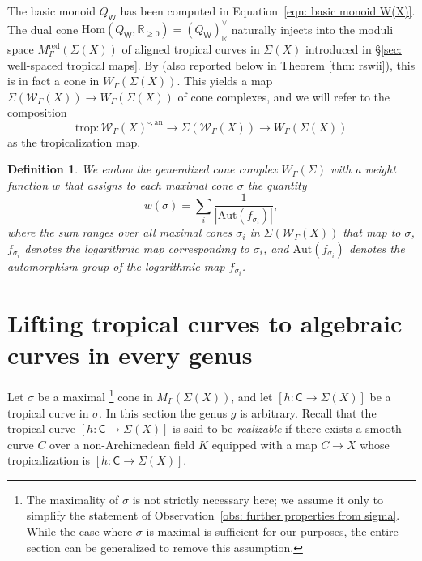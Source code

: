 \documentclass{article}
\def\N{{\mathbb{N}}}
\def\cW{\mathcal{W}}
\newtheorem{definition}{Definition}[section]
\newcommand{\W}{\mathsf{W}}
\begin{document}
The basic monoid $Q_{\W}$ has been computed in Equation~\eqref{eqn: basic monoid W(X)}. 
The dual cone
$
\mathrm{Hom}(Q_{\W}, \mathbb{R}_{\ge 0}) = (Q_{\W})^\vee_{\mathbb{R}}
$
naturally injects into the moduli space $M_{\Gamma}^{\mathrm{red}}(\Sigma(X))$ of aligned tropical curves in $\Sigma(X)$ introduced in \S\ref{sec: well-spaced tropical maps}. 
By \cite[Theorem~4.4.8]{RSWII} (also reported below in Theorem \ref{thm: rswii}), this is in fact a cone in $W_\Gamma(\Sigma(X))$. 
This yields a map
$
\Sigma(\mathcal{W}_{\Gamma}(X)) \to W_\Gamma(\Sigma(X))
$
of cone complexes, and we will refer to the composition
\[
\mathrm{trop} \colon \mathcal{W}_\Gamma(X)^{\circ, \mathrm{an}} 
\to \Sigma(\mathcal{W}_{\Gamma}(X)) 
\to W_\Gamma(\Sigma(X))
\]
as the tropicalization map.

\begin{definition}\label{def: weights}
    We endow the generalized cone complex $W_{\Gamma}(\Sigma)$ with a weight function $w$ that assigns to each maximal cone $\sigma$ the quantity
\[
w(\sigma)= \sum_i \frac{1}{|\mathrm{Aut}(f_{\sigma_i})|},
\]
where the sum ranges over all maximal cones $\sigma_i$ in $\Sigma(\cW_{\Gamma}(X))$ that map to $\sigma$,  $f_{\sigma_i}$ denotes the logarithmic map corresponding to $\sigma_i$, and $\mathrm{Aut}(f_{\sigma_i})$ denotes the automorphism group of the logarithmic map $f_{\sigma_i}$.
\end{definition}




\section{Lifting tropical curves to algebraic curves in every genus}\label{sec: realizability}


Let $\sigma$ be a maximal \footnote{ The maximality of $\sigma$ is not strictly necessary here; we assume it only to simplify the statement of Observation~\ref{obs: further properties from sigma}. While the case where $\sigma$ is maximal is sufficient for our purposes, the entire section can be generalized to remove this assumption. } cone in $M_{\Gamma}(\Sigma(X))$, and let $[h \colon \mathsf{C} \to \Sigma(X)]$ be a tropical curve in $\sigma$. In this section the genus $g$ is arbitrary. Recall that the tropical curve $[h \colon \mathsf{C} \to \Sigma(X)]$ is said to be \emph{realizable} if there exists a smooth curve $C$ over a non-Archimedean field $K$ equipped with a map $C \to X$ whose tropicalization is $[h \colon \mathsf{C} \to \Sigma(X)]$. %
\end{document}
